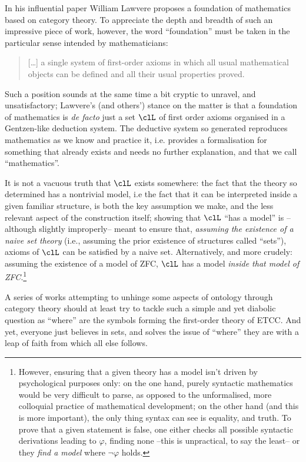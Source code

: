 In his influential paper \cite{lajolla} William Lawvere proposes a foundation of mathematics based on category theory. To appreciate the depth and breadth of such an impressive piece of work, however, the word ``foundation'' must be taken in the particular sense intended by mathematicians:
\begin{quote}
	[\dots\unkern] a single system of first-order axioms in which all usual mathematical objects can be defined and all their usual properties proved.
\end{quote}
Such a position sounds at the same time a bit cryptic to unravel, and unsatisfactory; Lawvere's (and others') stance on the matter is that a foundation of mathematics is \emph{de facto} just a set $\clL$ of first order axioms organised in a Gentzen-like deduction system. The deductive system so generated reproduces mathematics as we know and practice it, i.e. provides a formalisation for something that already exists and needs no further explanation, and that we call ``mathematics''.

It is not a vacuous truth that $\clL$ exists somewhere: the fact that the theory so determined has a nontrivial model, i.e the fact that it can be interpreted inside a given familiar structure, is both the key assumption we make, and the less relevant aspect of the construction itself; showing that $\clL$ ``has a model'' is --although slightly improperly-- meant to ensure that, \emph{assuming the existence of a naive set theory} (i.e., assuming the prior existence of structures called ``sets''), axioms of $\clL$ can be satisfied by a naive set. Alternatively, and more crudely: assuming the existence of a model of ZFC, $\clL$ has a model \emph{inside that model of ZFC}.\footnote{However, ensuring that a given theory has a model isn't driven by psychological purposes only: on the one hand, purely syntactic mathematics would be very difficult to parse, as opposed to the unformalised, more colloquial practice of mathematical development; on the other hand (and this is more important), the only thing syntax can see is equality, and truth. To prove that a given statement is false, one either checks all possible syntactic derivations leading to $\varphi$, finding none --this is unpractical, to say the least-- or they \emph{find a model} where $\lnot\varphi$ holds.}

A series of works attempting to unhinge some aspects of ontology through category theory should at least try to tackle such a simple and yet diabolic question as ``where'' are the symbols forming the first-order theory of ETCC. And yet, everyone just believes in sets, and solves the issue of ``where'' they are with a leap of faith from which all else follows.

